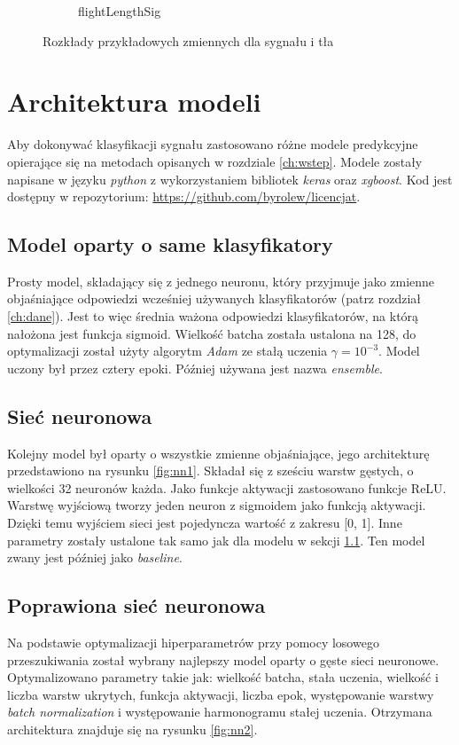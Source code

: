 \documentclass{pracalicmgr}
\begin{document}
\begin{figure}[H]
\begin{subfigure}{.5\textwidth}
	\caption{flightLengthSig}
	\end{subfigure}
	\caption{Rozkłady przykładowych zmiennych dla sygnału i tła}
	\label{fig:diff}
	\end{figure}	

		
    \chapter{Architektura modeli}
	Aby dokonywać klasyfikacji sygnału zastosowano różne modele predykcyjne opierające się na metodach opisanych w rozdziale \ref{ch:wstep}. Modele zostały napisane w języku \textit{python} z wykorzystaniem bibliotek \textit{keras} oraz \textit{xgboost}. Kod jest dostępny w repozytorium: \url{https://github.com/byrolew/licencjat}.
	\section{Model oparty o same klasyfikatory}
	\label{sec:mod1}
	Prosty model, składający się z jednego neuronu, który przyjmuje jako zmienne objaśniające odpowiedzi wcześniej używanych klasyfikatorów (patrz rozdział \ref{ch:dane}). Jest to więc średnia ważona odpowiedzi klasyfikatorów, na którą nałożona jest funkcja sigmoid. Wielkość batcha została ustalona na 128, do optymalizacji został użyty algorytm \textit{Adam} ze stałą uczenia $\gamma = 10^{-3}$. Model uczony był przez cztery epoki. Później używana jest nazwa \textit{ensemble}.

	\section{Sieć neuronowa}
	\label{sec:mod2}
	Kolejny model był oparty o wszystkie zmienne objaśniające, jego architekturę przedstawiono na rysunku \ref{fig:nn1}. Składał się z sześciu warstw gęstych, o wielkości 32 neuronów każda. Jako funkcje aktywacji zastosowano funkcje ReLU. Warstwę wyjściową tworzy jeden neuron z sigmoidem jako funkcją aktywacji. Dzięki temu wyjściem sieci jest pojedyncza wartość z zakresu [0, 1]. Inne parametry zostały ustalone tak samo jak dla modelu w sekcji \ref{sec:mod1}. Ten model zwany jest później jako \textit{baseline}.
	
	\section{Poprawiona sieć neuronowa}
	Na podstawie optymalizacji hiperparametrów przy pomocy losowego przeszukiwania został wybrany najlepszy model oparty o gęste sieci neuronowe. Optymalizowano parametry takie jak: wielkość batcha, stała uczenia, wielkość i liczba warstw ukrytych, funkcja aktywacji, liczba epok, występowanie warstwy \textit{batch normalization} i występowanie harmonogramu stałej uczenia. Otrzymana architektura znajduje się na rysunku \ref{fig:nn2}. 
	
\end{document}
